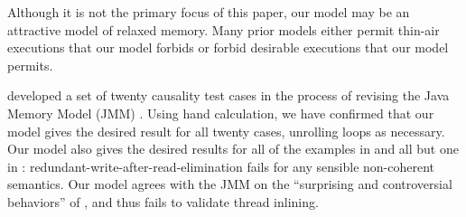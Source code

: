 \documentclass[conference]{IEEEtran}
\theoremstyle{plain}
\theoremstyle{definition}
\begin{document}
Although it is not the primary focus of this paper, our model may be an
attractive model of relaxed memory.  Many prior models either permit
thin-air executions that our model forbids or forbid desirable executions
that our model permits.



\citet{PughWebsite} developed a set of twenty {causality test cases} in the
process of revising the Java Memory Model (JMM)
\cite{Manson:2005:JMM:1047659.1040336}.  Using hand calculation, we have
confirmed that our model gives the desired result for all twenty cases,
unrolling loops as necessary.  Our model also gives the desired results for
all of the examples in \citet[]{DBLP:conf/esop/BattyMNPS15} and
all but one in \citet[]{SevcikThesis}:
redundant-write-after-read-elimination fails for any
sensible non-coherent semantics.  Our model agrees with the JMM on the
``surprising and controversial behaviors'' of \citet[]{Manson:2005:JMM:1047659.1040336}, and thus fails to validate thread
inlining.
\end{document}
